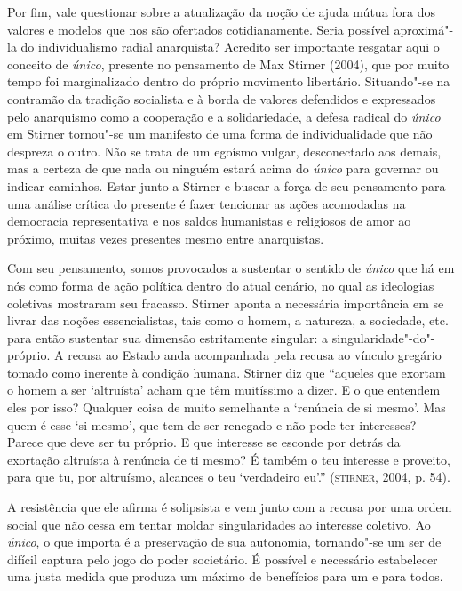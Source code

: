 Por fim, vale questionar sobre a atualização da noção de ajuda mútua
fora dos valores e modelos que nos são ofertados cotidianamente. Seria
possível aproximá"-la do individualismo radial anarquista? Acredito ser
importante resgatar aqui o conceito de \emph{único}, presente no
pensamento de Max Stirner (2004), que por muito tempo foi marginalizado
dentro do próprio movimento libertário. Situando"-se na contramão da
tradição socialista e à borda de valores defendidos e expressados pelo
anarquismo como a cooperação e a solidariedade, a defesa radical do
\emph{único} em Stirner tornou"-se um manifesto de uma forma de
individualidade que não despreza o outro. Não se trata de um egoísmo
vulgar, desconectado aos demais, mas a certeza de que nada ou ninguém
estará acima do \emph{único} para governar ou indicar caminhos. Estar
junto a Stirner e buscar a força de seu pensamento para uma análise
crítica do presente é fazer tencionar as ações acomodadas na democracia
representativa e nos saldos humanistas e religiosos de amor ao próximo,
muitas vezes presentes mesmo entre anarquistas.

Com seu pensamento, somos provocados a sustentar o sentido de
\emph{único} que há em nós como forma de ação política dentro do atual
cenário, no qual as ideologias coletivas mostraram seu fracasso. Stirner
aponta a necessária importância em se livrar das noções essencialistas,
tais como o homem, a natureza, a sociedade, etc. para então sustentar
sua dimensão estritamente singular: a singularidade"-do"-próprio. A recusa
ao Estado anda acompanhada pela recusa ao vínculo gregário tomado como
inerente à condição humana. Stirner diz que ``aqueles que exortam o
homem a ser `altruísta' acham que têm muitíssimo a dizer. E o que
entendem eles por isso? Qualquer coisa de muito semelhante a `renúncia
de si mesmo'. Mas quem é esse `si mesmo', que tem de ser renegado e não
pode ter interesses? Parece que deve ser tu próprio. E que interesse se
esconde por detrás da exortação altruísta à renúncia de ti mesmo? É
também o teu interesse e proveito, para que tu, por altruísmo, alcances
o teu `verdadeiro eu'.'' (\textsc{stirner}, 2004, p. 54).

A resistência que ele afirma é solipsista e vem junto com a recusa por
uma ordem social que não cessa em tentar moldar singularidades ao
interesse coletivo. Ao \emph{único}, o que importa é a preservação de
sua autonomia, tornando"-se um ser de difícil captura pelo jogo do poder
societário. É possível e necessário estabelecer uma justa medida que
produza um máximo de benefícios para um e para todos.

